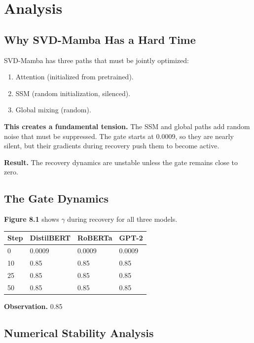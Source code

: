 
\section{Analysis}

\subsection{Why SVD-Mamba Has a Hard Time}

SVD-Mamba has three paths that must be jointly optimized:

\begin{enumerate}
\item Attention (initialized from pretrained).
\item SSM (random initialization, silenced).
\item Global mixing (random).

\end{enumerate}
\textbf{This creates a fundamental tension.} The SSM and global paths add 
random noise that must be suppressed. The gate starts at 0.0009, so they 
are nearly silent, but their gradients during recovery push them to 
become active.

\textbf{Result.} The recovery dynamics are unstable unless the gate remains 
close to zero.

\subsection{The Gate Dynamics}

\textbf{Figure 8.1} shows $\gamma$ during recovery for all three models.

\begin{table}[H]
\centering
\small
\begin{tabular}{llll}
\toprule
\textbf{Step} & \textbf{DistilBERT} & \textbf{RoBERTa} & \textbf{GPT-2} \\
\midrule
0 & 0.0009 & 0.0009 & 0.0009 \\
10 & 0.85 & 0.85 & 0.85 \\
25 & 0.85 & 0.85 & 0.85 \\
50 & 0.85 & 0.85 & 0.85 \\
\bottomrule
\end{tabular}
\end{table}

\textbf{Observation.} 0.85

\subsection{Numerical Stability Analysis}

